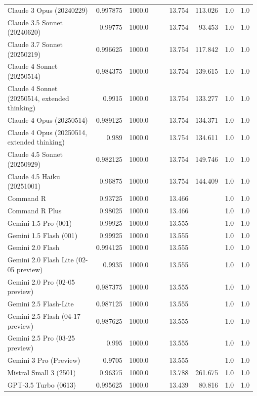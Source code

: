 \begin{table}[htp]
{\begin{tabular}{lrrrrrrrr}
Claude 3 Opus (20240229) & 0.997875 & 1000.0 &  &  & 13.754 & 113.026 & 1.0 & 1.0 \\
Claude 3.5 Sonnet (20240620) & 0.99775 & 1000.0 &  &  & 13.754 & 93.453 & 1.0 & 1.0 \\
Claude 3.7 Sonnet (20250219) & 0.996625 & 1000.0 &  &  & 13.754 & 117.842 & 1.0 & 1.0 \\
Claude 4 Sonnet (20250514) & 0.984375 & 1000.0 &  &  & 13.754 & 139.615 & 1.0 & 1.0 \\
Claude 4 Sonnet (20250514, extended thinking) & 0.9915 & 1000.0 &  &  & 13.754 & 133.277 & 1.0 & 1.0 \\
Claude 4 Opus (20250514) & 0.989125 & 1000.0 &  &  & 13.754 & 134.371 & 1.0 & 1.0 \\
Claude 4 Opus (20250514, extended thinking) & 0.989 & 1000.0 &  &  & 13.754 & 134.611 & 1.0 & 1.0 \\
Claude 4.5 Sonnet (20250929) & 0.982125 & 1000.0 &  &  & 13.754 & 149.746 & 1.0 & 1.0 \\
Claude 4.5 Haiku (20251001) & 0.96875 & 1000.0 &  &  & 13.754 & 144.409 & 1.0 & 1.0 \\
Command R & 0.93725 & 1000.0 &  &  & 13.466 &  & 1.0 & 1.0 \\
Command R Plus & 0.98025 & 1000.0 &  &  & 13.466 &  & 1.0 & 1.0 \\
Gemini 1.5 Pro (001) & 0.99925 & 1000.0 &  &  & 13.555 &  & 1.0 & 1.0 \\
Gemini 1.5 Flash (001) & 0.99925 & 1000.0 &  &  & 13.555 &  & 1.0 & 1.0 \\
Gemini 2.0 Flash & 0.994125 & 1000.0 &  &  & 13.555 &  & 1.0 & 1.0 \\
Gemini 2.0 Flash Lite (02-05 preview) & 0.9935 & 1000.0 &  &  & 13.555 &  & 1.0 & 1.0 \\
Gemini 2.0 Pro (02-05 preview) & 0.987375 & 1000.0 &  &  & 13.555 &  & 1.0 & 1.0 \\
Gemini 2.5 Flash-Lite & 0.987125 & 1000.0 &  &  & 13.555 &  & 1.0 & 1.0 \\
Gemini 2.5 Flash (04-17 preview) & 0.987625 & 1000.0 &  &  & 13.555 &  & 1.0 & 1.0 \\
Gemini 2.5 Pro (03-25 preview) & 0.995 & 1000.0 &  &  & 13.555 &  & 1.0 & 1.0 \\
Gemini 3 Pro (Preview) & 0.9705 & 1000.0 &  &  & 13.555 &  & 1.0 & 1.0 \\
Mistral Small 3 (2501) & 0.96375 & 1000.0 &  &  & 13.788 & 261.675 & 1.0 & 1.0 \\
GPT-3.5 Turbo (0613) & 0.995625 & 1000.0 &  &  & 13.439 & 80.816 & 1.0 & 1.0 \\

\end{tabular}}
\end{table}
